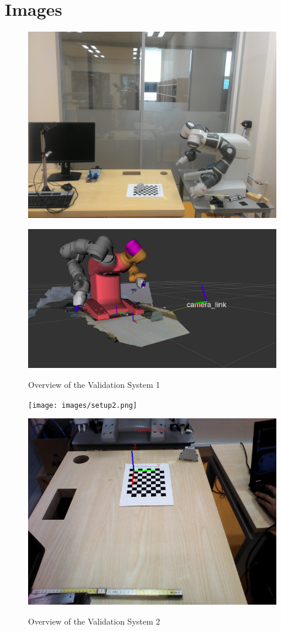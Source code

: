 \appendix
\chapter*{Images}
\label{chap:results}


\begin{figure}[htp]
\begin{center}
{
  \includegraphics[clip,width=0.6\columnwidth]{images/setup1.jpg}
}
\end{center}
\begin{center}
{
  \includegraphics[clip,width=0.6\columnwidth]{images/system1.jpg}
}
\end{center}
\caption{Overview of the Validation System 1}
\label{setupsystem1}
\end{figure}




\begin{figure}[htp]
\begin{center}
{
  \texttt{[image: images/setup2.png]}
}
\end{center}
\begin{center}
{
  \includegraphics[clip,width=0.6\columnwidth]{images/setup3.jpg}
}
\end{center}
\caption{Overview of the Validation System 2}
\label{setupsystem2}
\end{figure}



